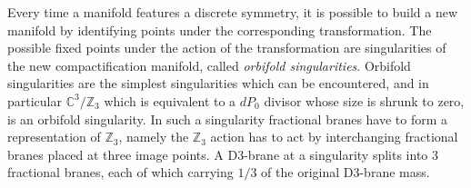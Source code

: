 \documentclass[12pt,a4paper]{book}
\begin{document}
Every time a manifold features a discrete symmetry, it is possible to build a new manifold by identifying points under the corresponding transformation. The possible fixed points under the action of the transformation are singularities of the new compactification manifold, called \textit{orbifold singularities}. Orbifold singularities are the simplest singularities which can be encountered, and in particular $\mathbb{C}^3/\mathbb{Z}_3$ which is equivalent to a $dP_0$ divisor whose size is shrunk to zero, is an orbifold singularity. In such a singularity fractional branes have to form a representation of $\mathbb{Z}_3$, namely the $\mathbb{Z}_3$ action has to act by interchanging fractional branes placed at three image points. A D3-brane at a singularity splits into 3 fractional branes, each of which carrying $1/3$ of the original D3-brane mass.\\
\end{document}
